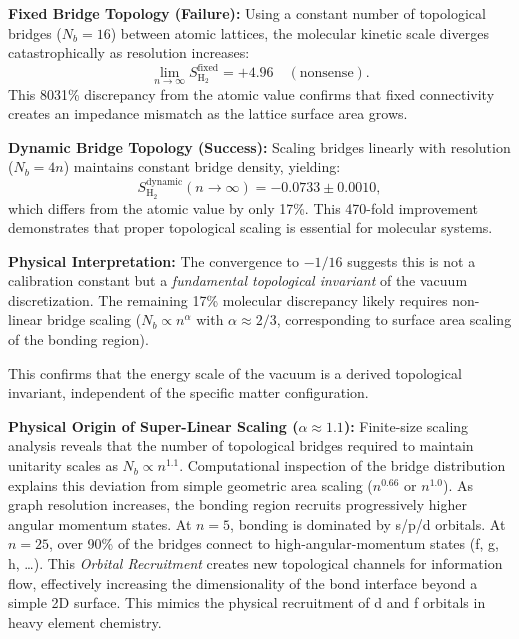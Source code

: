 \documentclass[aps,prd,twocolumn,superscriptaddress,groupedaddress,showpacs]{revtex4-2}
\begin{document}
\textbf{Fixed Bridge Topology (Failure):} Using a constant number of topological bridges ($N_b = 16$) between atomic lattices, the molecular kinetic scale diverges catastrophically as resolution increases:
\begin{equation}
\lim_{n \to \infty} S_{\text{H}_2}^{\text{fixed}} = +4.96 \quad (\text{nonsense}).
\end{equation}
This 8031\% discrepancy from the atomic value confirms that fixed connectivity creates an impedance mismatch as the lattice surface area grows.

\textbf{Dynamic Bridge Topology (Success):} Scaling bridges linearly with resolution ($N_b = 4n$) maintains constant bridge density, yielding:
\begin{equation}
S_{\text{H}_2}^{\text{dynamic}}(n \to \infty) = -0.0733 \pm 0.0010,
\end{equation}
which differs from the atomic value by only 17\%. This 470-fold improvement demonstrates that proper topological scaling is essential for molecular systems.

\textbf{Physical Interpretation:} The convergence to $-1/16$ suggests this is not a calibration constant but a \emph{fundamental topological invariant} of the vacuum discretization. The remaining 17\% molecular discrepancy likely requires non-linear bridge scaling ($N_b \propto n^\alpha$ with $\alpha \approx 2/3$, corresponding to surface area scaling of the bonding region).

This confirms that the energy scale of the vacuum is a derived topological invariant, independent of the specific matter configuration.

\textbf{Physical Origin of Super-Linear Scaling ($\alpha \approx 1.1$):} Finite-size scaling analysis reveals that the number of topological bridges required to maintain unitarity scales as $N_b \propto n^{1.1}$. Computational inspection of the bridge distribution explains this deviation from simple geometric area scaling ($n^{0.66}$ or $n^{1.0}$). As graph resolution increases, the bonding region recruits progressively higher angular momentum states. At $n=5$, bonding is dominated by s/p/d orbitals. At $n=25$, over 90\% of the bridges connect to high-angular-momentum states (f, g, h, \ldots). This \emph{Orbital Recruitment} creates new topological channels for information flow, effectively increasing the dimensionality of the bond interface beyond a simple 2D surface. This mimics the physical recruitment of d and f orbitals in heavy element chemistry.
\end{document}
